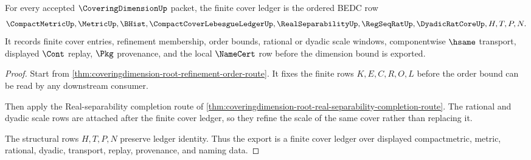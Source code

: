 \begin{theorem}
\label{thm:covering-dimension-finite-cover-ledger}
For every accepted $\CoveringDimensionUp$ packet, the finite cover ledger is the ordered BEDC row
$$
\CompactMetricUp,\MetricUp,\BHist,\CompactCoverLebesgueLedgerUp,\RealSeparabilityUp,\RegSeqRatUp,\DyadicRatCoreUp,H,T,P,N .
$$
It records finite cover entries, refinement membership, order bounds, rational or dyadic scale windows, componentwise $\hsame$ transport, displayed $\Cont$ replay, $\Pkg$ provenance, and the local $\NameCert$ row before the dimension bound is exported.
\end{theorem}
\begin{proof}
Start from \autoref{thm:coveringdimension-root-refinement-order-route}. It fixes the finite rows $K,E,C,R,O,L$ before the order bound can be read by any downstream consumer.

Then apply the Real-separability completion route of \autoref{thm:coveringdimension-root-real-separability-completion-route}. The rational and dyadic scale rows are attached after the finite cover ledger, so they refine the scale of the same cover rather than replacing it.

The structural rows $H,T,P,N$ preserve ledger identity. Thus the export is a finite cover ledger over displayed compactmetric, metric, rational, dyadic, transport, replay, provenance, and naming data.
\end{proof}

